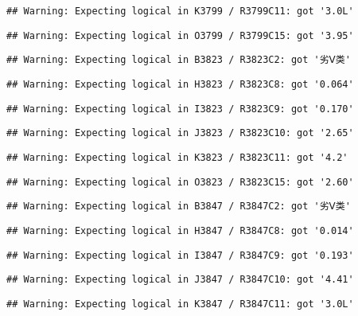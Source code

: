 \documentclass[
]{article}
\begin{document}
\begin{verbatim}
## Warning: Expecting logical in K3799 / R3799C11: got '3.0L'
\end{verbatim}

\begin{verbatim}
## Warning: Expecting logical in O3799 / R3799C15: got '3.95'
\end{verbatim}

\begin{verbatim}
## Warning: Expecting logical in B3823 / R3823C2: got '劣Ⅴ类'
\end{verbatim}

\begin{verbatim}
## Warning: Expecting logical in H3823 / R3823C8: got '0.064'
\end{verbatim}

\begin{verbatim}
## Warning: Expecting logical in I3823 / R3823C9: got '0.170'
\end{verbatim}

\begin{verbatim}
## Warning: Expecting logical in J3823 / R3823C10: got '2.65'
\end{verbatim}

\begin{verbatim}
## Warning: Expecting logical in K3823 / R3823C11: got '4.2'
\end{verbatim}

\begin{verbatim}
## Warning: Expecting logical in O3823 / R3823C15: got '2.60'
\end{verbatim}

\begin{verbatim}
## Warning: Expecting logical in B3847 / R3847C2: got '劣Ⅴ类'
\end{verbatim}

\begin{verbatim}
## Warning: Expecting logical in H3847 / R3847C8: got '0.014'
\end{verbatim}

\begin{verbatim}
## Warning: Expecting logical in I3847 / R3847C9: got '0.193'
\end{verbatim}

\begin{verbatim}
## Warning: Expecting logical in J3847 / R3847C10: got '4.41'
\end{verbatim}

\begin{verbatim}
## Warning: Expecting logical in K3847 / R3847C11: got '3.0L'
\end{verbatim}
\end{document}
